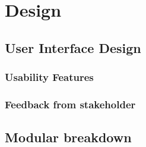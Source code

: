 \documentclass{article}
\begin{document}

\section{Design}

\subsection{User Interface Design}

\subsubsection{Usability Features}

\subsubsection{Feedback from stakeholder}

\subsection{Modular breakdown}
\end{document}
